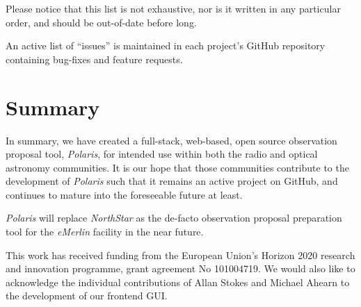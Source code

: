 \documentclass[11pt,twoside]{article}
\begin{document}
Please notice that this list is not exhaustive, nor is it written in any particular order, and should be
out-of-date before long.

An active list of ``issues'' is maintained in each project's GitHub repository containing
bug-fixes and feature requests.

\section{Summary}\label{sec:summary}
In summary, we have created a full-stack, web-based, open source observation proposal tool, \emph{Polaris},
for intended use within both the radio and optical astronomy communities.
It is our hope that those communities contribute to the development of \emph{Polaris} such that it remains an
active project on GitHub, and continues to mature into the foreseeable future at least.

\emph{Polaris} will replace \emph{NorthStar} as the de-facto observation proposal preparation tool for
the \emph{eMerlin} facility in the near future.

\acknowledgements This work has received funding from the European Union's Horizon 2020 research and innovation
programme, grant agreement No 101004719.
We would also like to acknowledge the individual contributions of Allan Stokes and Michael Ahearn to the
development of our frontend GUI\@.


\end{document}
